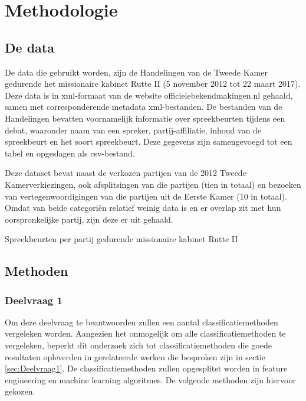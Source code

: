 \section{Methodologie}
\label{sec:meth}


\subsection{De data}
De data die gebruikt worden, zijn de Handelingen van de Tweede Kamer gedurende het missionaire kabinet Rutte II (5 november 2012 tot 22 maart 2017). Deze data is in xml-formaat van de website officielebekendmakingen.nl gehaald, samen met corresponderende metadata xml-bestanden. De bestanden van de Handelingen bevatten voornamelijk informatie over spreekbeurten tijdens een debat, waaronder naam van een spreker, partij-affiliatie, inhoud van de spreekbeurt en het soort spreekbeurt. Deze gegevens zijn samengevoegd tot een tabel en opgeslagen als csv-bestand.\par
Deze dataset bevat naast de verkozen partijen van de 2012 Tweede Kamerverkiezingen, ook afsplitsingen van die partijen (tien in totaal) en bezoeken van vertegenwoordigingen van die partijen uit de Eerste Kamer (10 in totaal). Omdat van beide categori\"{e}n relatief weinig data is en er overlap zit met hun oorspronkelijke partij, zijn deze er uit gehaald.
\begin{table}[H]
\caption{Spreekbeurten per partij gedurende missionaire kabinet Rutte II}
\centering

\end{table}




\pagebreak
\subsection{Methoden}


\subsubsection{Deelvraag 1}

Om deze deelvraag te beantwoorden zullen een aantal classificatiemethoden vergeleken worden. Aangezien het onmogelijk om alle classificatiemethoden te vergeleken, beperkt dit onderzoek zich tot classificatiemethoden die goede resultaten opleverden in gerelateerde werken die besproken zijn in sectie \ref{sec:Deelvraag1}. De classificatiemethoden zullen opgesplitst worden in feature engineering en machine learning algoritmes. De volgende methoden zijn hiervoor gekozen.

